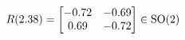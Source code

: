 \documentclass[preview]{standalone}
\begin{document}
\begin{align*}
\special{dvisvgm:raw <g id='unique000'>}R(2.38) = \begin{bmatrix} -0.72 & -0.69 \\ 0.69 & -0.72 \end{bmatrix} \in \text{SO}(2)\special{dvisvgm:raw </g>}
\end{align*}
\end{document}

